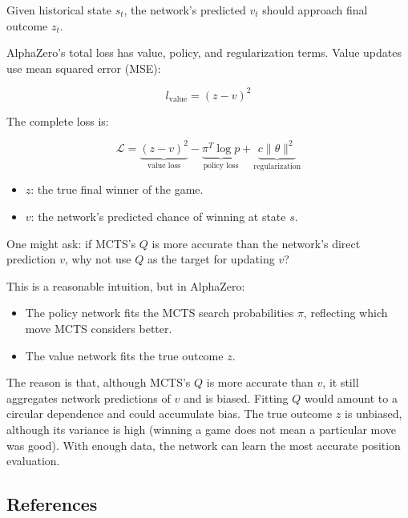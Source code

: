 Given historical state \(s_t\), the network's predicted \(v_t\) should approach final outcome \(z_t\).

AlphaZero's total loss has value, policy, and regularization terms. Value updates use mean squared error (MSE):

\[
l_{\mathrm{value}} = (z - v)^2
\]

The complete loss is:

\[
\mathcal{L} = \underbrace{(z - v)^2}_{\text{value loss}}
- \underbrace{\pi^{T}\log p}_{\text{policy loss}}
+ \underbrace{c\|\theta\|^2}_{\text{regularization}}
\]

\begin{itemize}
\tightlist
\item
  \(z\): the true final winner of the game.
\item
  \(v\): the network's predicted chance of winning at state \(s\).
\end{itemize}

One might ask: if MCTS's \(Q\) is more accurate than the network's direct prediction \(v\), why not use \(Q\) as the target for updating \(v\)?

This is a reasonable intuition, but in AlphaZero:

\begin{itemize}
\tightlist
\item
  The policy network fits the MCTS search probabilities \(\pi\), reflecting which move MCTS considers better.
\item
  The value network fits the true outcome \(z\).
\end{itemize}

The reason is that, although MCTS's \(Q\) is more accurate than \(v\), it still aggregates network predictions of \(v\) and is biased. Fitting \(Q\) would amount to a circular dependence and could accumulate bias. The true outcome \(z\) is unbiased, although its variance is high (winning a game does not mean a particular move was good). With enough data, the network can learn the most accurate position evaluation.

\FloatBarrier
{}
\hypertarget{references-81}{%
\subsection{References}\label{references-81}}

